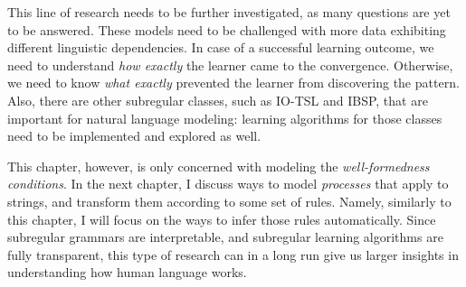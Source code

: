 This line of research needs to be further investigated, as many questions are yet to be answered.
These models need to be challenged with more data exhibiting different linguistic dependencies.
In case of a successful learning outcome, we need to understand \emph{how exactly} the learner came to the convergence.
Otherwise, we need to know \emph{what exactly} prevented the learner from discovering the pattern.
Also, there are other subregular classes, such as IO-TSL and IBSP, that are important for natural language modeling: learning algorithms for those classes need to be implemented and explored as well.

This chapter, however, is only concerned with modeling the \emph{well-formedness conditions}.
In the next chapter, I discuss ways to model \emph{processes} that apply to strings, and transform them according to some set of rules.
Namely, similarly to this chapter, I will focus on the ways to infer those rules automatically.
Since subregular grammars are interpretable, and subregular learning algorithms are fully transparent, this type of research can in a long run give us larger insights in understanding how human language works.